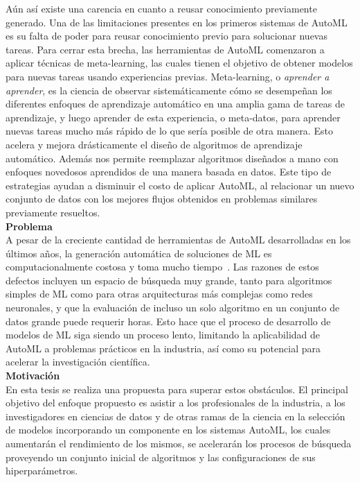 Aún así existe una carencia en cuanto a reusar conocimiento previamente
generado. Una de las limitaciones presentes en los primeros sistemas de AutoML
es su falta de poder para reusar conocimiento previo para solucionar nuevas
tareas. Para cerrar esta brecha, las herramientas de AutoML comenzaron a
aplicar técnicas de meta-learning, las cuales tienen el objetivo de obtener
modelos para nuevas tareas usando experiencias previas. Meta-learning, o
\emph{aprender a aprender}, es la ciencia de observar sistemáticamente cómo se
desempeñan los diferentes enfoques de aprendizaje automático en una amplia
gama de tareas de aprendizaje, y luego aprender de esta experiencia, o
meta-datos, para aprender nuevas tareas mucho más rápido de lo que sería
posible de otra manera. Esto acelera y mejora drásticamente el diseño
de algoritmos de aprendizaje automático. Además nos permite reemplazar
algoritmos diseñados a mano con enfoques novedosos aprendidos de una manera
basada en datos. Este tipo de estrategias ayudan a disminuir el costo de
aplicar AutoML, al relacionar un nuevo conjunto de datos con los mejores flujos
obtenidos en problemas similares previamente resueltos.\\

\textbf{\Large Problema}\\

A pesar de la creciente cantidad de herramientas de AutoML desarrolladas en los
últimos años, la generación automática de soluciones de ML es
computacionalmente costosa y toma mucho tiempo~. Las
razones de estos defectos incluyen un espacio de búsqueda muy grande, tanto
para algoritmos simples de ML como para otras arquitecturas más complejas como
redes neuronales, y que la evaluación de incluso un solo algoritmo en un
conjunto de datos grande puede requerir horas. Esto hace que el proceso de
desarrollo de modelos de ML siga siendo un proceso lento, limitando la
aplicabilidad de AutoML a problemas prácticos en la industria, así como su
potencial para acelerar la investigación científica.\\

\textbf{\Large Motivación}\\

En esta tesis se realiza una propuesta para superar estos obstáculos. El
principal objetivo del enfoque propuesto es asistir a los profesionales de la
industria, a los investigadores en ciencias de datos y de otras ramas de la
ciencia en la selección de modelos incorporando un componente en los
sistemas AutoML, los cuales aumentarán el rendimiento de los mismos, se
acelerarán los procesos de búsqueda proveyendo un conjunto inicial de
algoritmos y las configuraciones de sus hiperparámetros.

